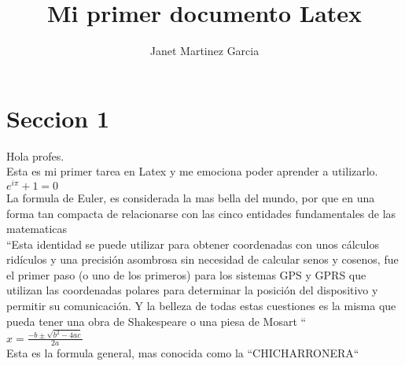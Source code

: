 \documentclass[a4paper,10pt]{article}
\title{Mi primer documento Latex} %
\author{Janet Martinez Garcia} %
\begin{document}
\maketitle

% 

\section{Seccion 1}

Hola profes.\\ %

Esta es mi primer tarea en Latex y me emociona poder aprender a utilizarlo.\\%

$ e^{i \pi} + 1 = 0$\\
La formula de Euler, es considerada la mas bella del mundo, por que en una forma tan compacta de relacionarse con las cinco entidades fundamentales de las matematicas\\ “Esta identidad se puede utilizar para obtener coordenadas con unos cálculos ridículos y una precisión asombrosa sin necesidad de calcular senos y cosenos, fue el primer paso (o uno de los primeros) para los sistemas GPS y GPRS que utilizan las coordenadas polares para determinar la posición del dispositivo y permitir su comunicación.
Y la belleza de todas estas cuestiones es la misma que pueda tener una obra de Shakespeare o una piesa de Mosart “\\

$x = \frac {-b \pm \sqrt {b^2 - 4ac}}{2a}$\\
Esta es la formula general, mas conocida como la “CHICHARRONERA“\\

\end{document}
